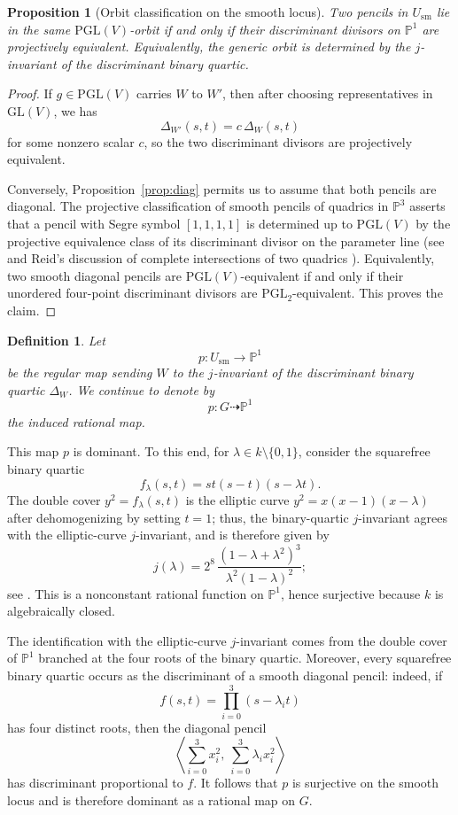\documentclass[11pt]{article}
\newtheorem{proposition}[theorem]{Proposition}
\newtheorem{definition}[theorem]{Definition}
\newcommand{\Pj}{\mathbb P}
\newcommand{\PGL}{\mathrm{PGL}}
\newcommand{\GL}{\mathrm{GL}}
\begin{document}
\begin{proposition}[Orbit classification on the smooth locus]\label{prop:orbit-classification}
Two pencils in $U_{\mathrm{sm}}$ lie in the same $\PGL(V)$-orbit if and only if their discriminant divisors on $\Pj^1$ are projectively equivalent. Equivalently, the generic orbit is determined by the $j$-invariant of the discriminant binary quartic.
\end{proposition}

\begin{proof}
If $g\in \PGL(V)$ carries $W$ to $W'$, then after choosing representatives in $\GL(V)$, we has
\[
\Delta_{W'}(s,t)=c\,\Delta_W(s,t)
\]
for some nonzero scalar $c$, so the two discriminant divisors are projectively equivalent.

Conversely, Proposition~\ref{prop:diag} permits us to assume that both pencils are diagonal. The projective classification of smooth pencils of quadrics in $\Pj^3$ asserts that a pencil with Segre symbol $[1,1,1,1]$ is determined up to $\PGL(V)$ by the projective equivalence class of its discriminant divisor on the parameter line (see \cite[\S8.2]{Dolgachev} and Reid's discussion of complete intersections of two quadrics \cite{Reid}). Equivalently, two smooth diagonal pencils are $\PGL(V)$-equivalent if and only if their unordered four-point discriminant divisors are $\PGL_2$-equivalent. This proves the claim.
\end{proof}

\begin{definition}
Let
\[
p\colon U_{\mathrm{sm}}\to \Pj^1
\]
be the regular map sending $W$ to the $j$-invariant of the discriminant binary quartic $\Delta_W$. We continue to denote by
\[
p\colon G\dashrightarrow \Pj^1
\]
the induced rational map.
\end{definition}

This map $p$ is dominant. To this end, for $\lambda\in k\setminus\{0,1\}$, consider the squarefree binary quartic
\[
f_\lambda(s,t)=st(s-t)(s-\lambda t).
\]
The double cover $y^2=f_\lambda(s,t)$ is the elliptic curve $y^2=x(x-1)(x-\lambda)$ after dehomogenizing by setting $t=1$; thus, the binary-quartic $j$-invariant agrees with the elliptic-curve $j$-invariant, and is therefore given by
\[
j(\lambda)=2^8 \,\frac{(1-\lambda+\lambda^2)^3}{\lambda^2(1-\lambda)^2};
\]
see \cite[Chapter~III]{Silverman}. This is a nonconstant rational function on $\Pj^1$, hence surjective because $k$ is algebraically closed. 

The identification with the elliptic-curve $j$-invariant comes from the double cover of $\Pj^1$ branched at the four roots of the binary quartic. Moreover, every squarefree binary quartic occurs as the discriminant of a smooth diagonal pencil: indeed, if
\[
f(s,t)=\prod_{i=0}^3 (s-\lambda_i t)
\]
has four distinct roots, then the diagonal pencil
\[
\left\langle \sum_{i=0}^3 x_i^2,\ \sum_{i=0}^3 \lambda_i x_i^2\right\rangle
\]
has discriminant proportional to $f$. It follows that $p$ is surjective on the smooth locus and is therefore dominant as a rational map on $G$.
\end{document}
